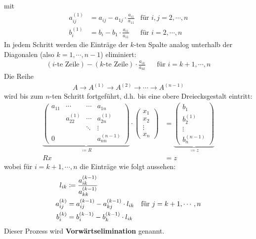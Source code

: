 \documentclass[ngerman,fontsize=11pt, paper=a4, parskip=half, titlepage=true, toc=bib]{scrbook}
\begin{document}
mit
\begin{align*}
	a_{ij}^{(1)} &= a_{ij}-a_{1j}\cdot \frac{a_{i1}}{a_{11}} & \text{für }i,j = 2, \cdots, n \\
	b_i^{(1)}      &= b_i- b_1\cdot \frac{a_{i1}}{a_{11}}        & \text{für }i = 2, \cdots, n 
\end{align*}
In jedem Schritt werden die Einträge der $k$-ten Spalte analog unterhalb der Diagonalen (also $k=1, \cdots, n-1$) eliminiert:
\begin{align*}
	(\text{$i$-te Zeile})- (\text{$k$-te Zeile})\cdot\frac{a_{ik}}{a_{kk}} && \text{für } i=k+1, \cdots ,n 
\end{align*}
Die Reihe 
\begin{gather*}
			A \rightarrow A^{(1)} \rightarrow A^{(2)} \rightarrow \dotsm \rightarrow A^{(n-1)}
\end{gather*}
wird bis zum $n$-ten Schritt fortgeführt, d.h. bis eine obere Dreiecksgestalt eintritt:
\begin{align}
\nonumber
\underbrace{	\begin{pmatrix}
	a_{11} & \dotsm & \dotsm & a_{1n} \\
	             & a_{22}^{(1)} & \dotsm & a_{2n}^{(1)} \\
	             &&              \ddots  &  \vdots \\
	   0        && &                             a_{nn}^{(n-1)}
	\end{pmatrix}}_{\coloneqq R}
	\cdot
	\begin{pmatrix}
		x_1 \\
		x_2 \\
		\vdots \\
		x_n
	\end{pmatrix}
	& =
	\underbrace{\begin{pmatrix}
		b_1 \\
		b_2^{(1)} \\
		\vdots \\
		b_n^{(n-1)}
	\end{pmatrix}}_{\coloneqq z} \\
Rx &= z 	\label{II.1.1} 
\end{align}
wobei für  $i=k+1, \cdots ,n$ die Einträge wie folgt aussehen:
\begin{align}	
	l_{ik} &\coloneqq \frac{a_{ik}^{(k-1)}}{a_{kk}^{(k-1)}} \label{II.1.2} \\
	a_{ij}^{(k)} &= a_{ij}^{(k-1)} - a_{kj}^{(k-1)}\cdot l_{ik} \label{II.1.3}
				 & \text{für } j=k+1, \cdots , n\\ %
	b_i^{(k)} &= b_i^{(k-1)} -b_k^{(k-1)} \cdot   l_{ik}\label{II.1.4}\index{Vorwärtssubstitution}
\end{align}
Dieser Prozess wird \textbf{Vorwärtselimination} genannt.\\
\end{document}
